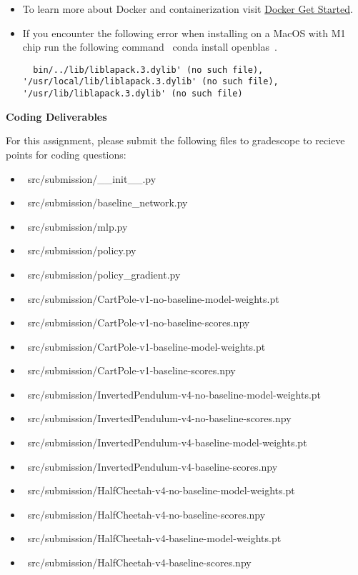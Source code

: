 \begin{itemize}
  \item To learn more about Docker and containerization visit \href{https://docs.docker.com/get-started/}{Docker Get Started}.

  \item If you encounter the following error when installing on a MacOS with M1 chip run the following command ~conda install openblas~.

  \begin{lstlisting}
  bin/../lib/liblapack.3.dylib' (no such file), '/usr/local/lib/liblapack.3.dylib' (no such file), '/usr/lib/liblapack.3.dylib' (no such file)
  \end{lstlisting}


\end{itemize}

\textbf{Coding Deliverables}

For this assignment, please submit the following files to gradescope to recieve points for coding questions:
\begin{itemize}
    \item ~src/submission/__init__.py~
    \item ~src/submission/baseline_network.py~
    \item ~src/submission/mlp.py~
    \item ~src/submission/policy.py~
    \item ~src/submission/policy_gradient.py~
    \item ~src/submission/CartPole-v1-no-baseline-model-weights.pt~
    \item ~src/submission/CartPole-v1-no-baseline-scores.npy~
    \item ~src/submission/CartPole-v1-baseline-model-weights.pt~
    \item ~src/submission/CartPole-v1-baseline-scores.npy~
    \item ~src/submission/InvertedPendulum-v4-no-baseline-model-weights.pt~
    \item ~src/submission/InvertedPendulum-v4-no-baseline-scores.npy~
    \item ~src/submission/InvertedPendulum-v4-baseline-model-weights.pt~
    \item ~src/submission/InvertedPendulum-v4-baseline-scores.npy~
    \item ~src/submission/HalfCheetah-v4-no-baseline-model-weights.pt~
    \item ~src/submission/HalfCheetah-v4-no-baseline-scores.npy~
    \item ~src/submission/HalfCheetah-v4-baseline-model-weights.pt~
    \item ~src/submission/HalfCheetah-v4-baseline-scores.npy~ \\
\end{itemize}  

\clearpage
